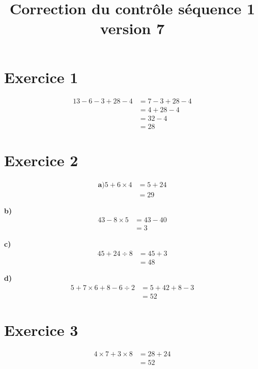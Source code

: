 \documentclass[12pt]{extarticle}
\title{\textbf{Correction du contrôle séquence 1 version 7}}
\author{}
\date{}
\begin{document}
\maketitle

\section*{Exercice 1}
\begin{align*}
13 - 6 - 3 + 28 - 4 &= 7 - 3 + 28 - 4 \\
                     &= 4 + 28 - 4 \\
                     &= 32 - 4 \\
                     &= 28
\end{align*}

\section*{Exercice 2}

\begin{align*}
\textbf{a)}
5 + 6 \times 4 &= 5 + 24 \\
               &= 29
\end{align*}

\textbf{b)}
\begin{align*}
43 - 8 \times 5 &= 43 - 40 \\
                &= 3
\end{align*}

\textbf{c)}
\begin{align*}
45 + 24 \div 8 &= 45 + 3 \\
               &= 48
\end{align*}

\textbf{d)}
\begin{align*}
5 + 7 \times 6 + 8 - 6 \div 2 &= 5 + 42 + 8 - 3 \\
                              &= 52
\end{align*}

\section*{Exercice 3}
\begin{align*}
4 \times 7 + 3 \times 8 &= 28 + 24 \\
                        &= 52
\end{align*}
\end{document}
